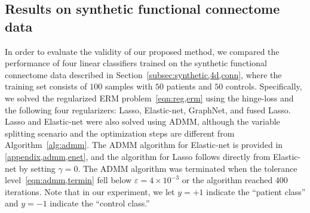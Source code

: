 \subsection{Results on synthetic functional connectome data}
\label{subsec:result,synth}
In order to evaluate the validity of our proposed method, we compared the performance of four linear classifiers trained on the synthetic functional connectome data described in Section~\ref{subsec:synthetic,4d,conn}, where the training set consists of $100$ samples with $50$ patients and $50$ controls.
Specifically, we solved the regularized ERM problem~\eqref{eqn:reg,erm} using the hinge-loss and the following four regularizers: Lasso, Elastic-net, GraphNet, and fused Lasso.
Lasso and Elastic-net were also solved using ADMM, although the variable splitting scenario and the optimization steps are different from Algorithm~\ref{alg:admm}.
The ADMM algorithm for Elastic-net is provided in \ref{appendix,admm,enet}, and the algorithm for Lasso follows directly from Elastic-net by setting $\gamma=0$.
The ADMM algorithm was terminated when the tolerance level~\eqref{eqn:admm,termin} fell below $\varepsilon=4\times 10^{-3}$ or the algorithm reached $400$ iterations.
Note that in our experiment, we let $y=+1$ indicate the ``patient class'' and $y=-1$ indicate the ``control class.''

\newcommand{\FOOTMESSAGE}{The grid search region for $\gamma$ is different for fused Lasso since we observed a clear drop-off in classification performance for any values of $\gamma$ higher than the range presented.  
We found this to be true for the real data experiment in Sec.~\ref{subsec:result,real,data} as well; see Fig.~\ref{fig:sim,grid,ntr} and Fig.~\ref{fig:grid,search}.}

